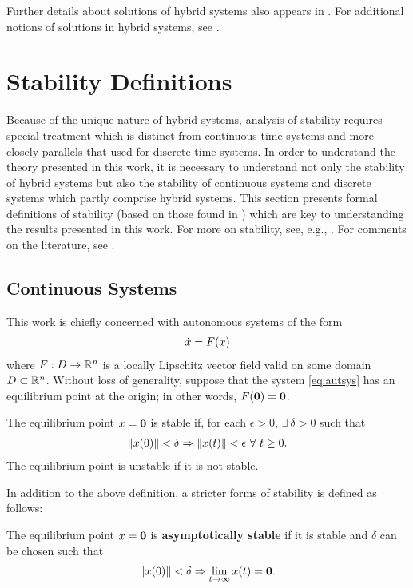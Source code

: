 Further details about solutions of hybrid systems also appears in
.
%
For additional notions of solutions in hybrid systems, see \cite{Filippov1988,
  Goebel2009, Haddad2001, Lygeros2003, Ye1998}.

\section{Stability Definitions} \label{sec:hsys-stability}

Because of the unique nature of hybrid systems, analysis of stability requires
special treatment which is distinct from continuous-time systems and more
closely parallels that used for discrete-time systems.
%
In order to understand the theory presented in this work, it is necessary to
understand not only the stability of hybrid systems but also the stability of
continuous systems and discrete systems which partly comprise hybrid systems.
%
This section presents formal definitions of stability (based on
those found in \cite[Ch. 4]{Khalil2002}) which are key to understanding the results presented in this
work.
%
For more on stability, see, e.g., \cite{Khalil2002, Teschl2012,
  Vidyasagar1993}.
%
For comments on the literature, see .

\subsection{Continuous Systems}
This work is chiefly concerned with autonomous systems of the form
\begin{align}
  \label{eq:autsys}
  {\dot {x}} = F(x)
\end{align}
where $F : D \to \mathbb{R}^{n}$ is a locally Lipschitz vector field valid on some
domain $D \subset \mathbb{R}^{n}$.
%
Without loss of generality, suppose that the system \eqref{eq:autsys} has an
equilibrium point at the origin;
%
in other words, $F({\mathbf 0}) = {\mathbf 0}$.
%
\begin{definition}
  The equilibrium point $x = {\mathbf 0}$ is stable if, for each $\epsilon > 0$,
  $\exists \ \delta > 0$ such that
  \begin{align*}
    \|x(0)\| < \delta \Rightarrow \|x(t)\| < \epsilon \ \forall \ t
    \geq 0.
  \end{align*}
  The equilibrium point is unstable if it is not stable.
\end{definition}

In addition to the above definition, a stricter forms of stability is defined as
follows:
%
\begin{definition}
  The equilibrium point $x = {\mathbf 0}$ is {\bf asymptotically stable} if it is
  stable and $\delta$ can be chosen such that
  \begin{align*}
    \|x(0)\| < \delta \Rightarrow \lim_{t \to \infty} x(t) = {\mathbf 0}.
  \end{align*}
\end{definition}

